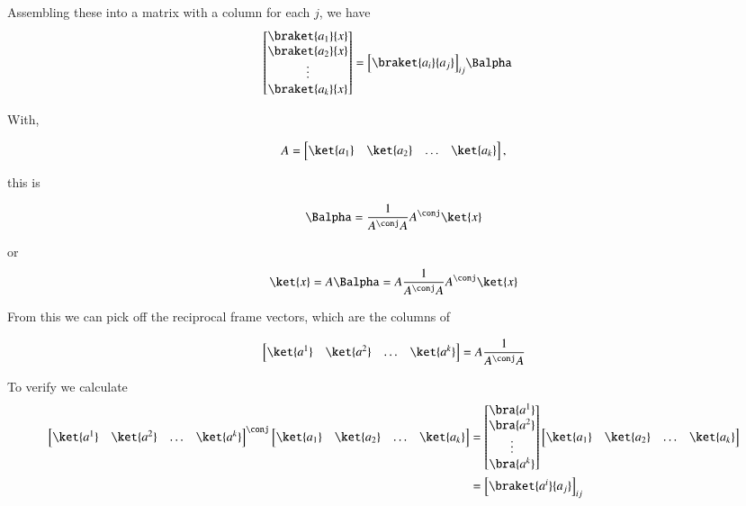 Assembling these into a matrix with a column for each $j$, we have
\begin{align*}
\begin{bmatrix}
\braket{a_1}{x} \\
\braket{a_2}{x} \\
\vdots \\
\braket{a_k}{x} \\
\end{bmatrix}
&=
{\begin{bmatrix}
\braket{a_i}{a_j}
\end{bmatrix}}_{ij}
\Balpha
\end{align*}

With,

\begin{align*}
A = 
\begin{bmatrix}
\ket{a_1} & \ket{a_2} & \hdots & \ket{a_k}
\end{bmatrix},
\end{align*}

this is

\begin{align*}
\Balpha = \inv{A^\conj A} A^\conj \ket{x}
\end{align*}

or 
\begin{align*}
\ket{x} = A \Balpha = A \inv{A^\conj A} A^\conj \ket{x}
\end{align*}

From this we can pick off the reciprocal frame vectors, which are the columns of 

\begin{align*}
\begin{bmatrix}
\ket{a^1} & \ket{a^2} & \hdots & \ket{a^k}
\end{bmatrix} = 
A \inv{A^\conj A}
\end{align*}

To verify we calculate 
\begin{align*}
{\begin{bmatrix}
\ket{a^1} & \ket{a^2} & \hdots & \ket{a^k}
\end{bmatrix}}^\conj
\begin{bmatrix}
\ket{a_1} & \ket{a_2} & \hdots & \ket{a_k}
\end{bmatrix}
&=
\begin{bmatrix}
\bra{a^1} \\ \bra{a^2} \\ \vdots \\ \bra{a^k}
\end{bmatrix}
\begin{bmatrix}
\ket{a_1} & \ket{a_2} & \hdots & \ket{a_k}
\end{bmatrix} \\
&= 
{
\begin{bmatrix}
\braket{a^i}{a_j}
\end{bmatrix}}_{ij}
\end{align*}

